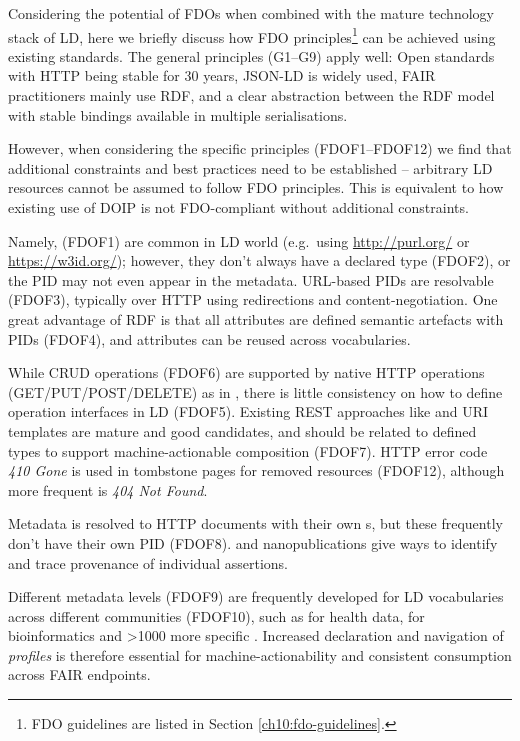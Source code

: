 Considering the potential of FDOs when combined with the mature
technology stack of LD, here we briefly discuss how 
FDO principles\footnote{
FDO guidelines are listed in Section \vref{ch10:fdo-guidelines}.
} can
be achieved using existing standards. The general principles (G1--G9)
apply well: Open standards with HTTP being stable for 30 years, \acrshort{JSON-LD}
is widely used, FAIR practitioners mainly use \acrshort{RDF}, and a clear
abstraction between the RDF model with stable bindings available in
multiple serialisations.

However, when considering the specific principles (FDOF1--FDOF12) we
find that additional constraints and best practices need to be
established -- arbitrary LD resources cannot be assumed to follow FDO
principles. This is equivalent to how existing use of \acrshort{DOIP} is not
FDO-compliant without additional constraints.

Namely, 
\cite{McMurry 2017}
(FDOF1) are common in \acrshort{LD} world (e.g.~using \url{http://purl.org/} or
\url{https://w3id.org/}); however, they don't always have a declared type
(FDOF2), or the PID may not even appear in the metadata. URL-based PIDs
are resolvable (FDOF3), typically over \acrshort{HTTP} using redirections and
content-negotiation. One great advantage of \acrshort{RDF} is that all attributes
are defined semantic artefacts with PIDs (FDOF4), and attributes can be
reused across vocabularies.

While \gls{CRUD} operations (FDOF6) are supported by native HTTP operations
(GET/PUT/POST/DELETE) as in ,
there is little consistency on how to define operation interfaces in LD
(FDOF5). Existing \acrshort{REST} approaches like
 \cite{Miller 2021} and
URI templates \cite{Gregorio 2012} are mature and
good candidates, and should be related to defined types to support
machine-actionable composition (FDOF7). HTTP error code \emph{410 Gone}
is used in tombstone pages for removed resources (FDOF12), although more
frequent is \emph{404 Not Found}.

Metadata is resolved to HTTP documents with their own s, but these
frequently don't have their own PID (FDOF8).
 and nanopublications
\cite{Kuhn 2021} give ways
to identify and trace provenance of individual assertions.

Different metadata levels (FDOF9) are frequently developed for LD
vocabularies across different communities (FDOF10), such as
 for health data,
 for bioinformatics and
\textgreater1000 more specific
.
Increased declaration and navigation of \emph{profiles} is therefore
essential for machine-actionability and consistent consumption across
FAIR endpoints.


